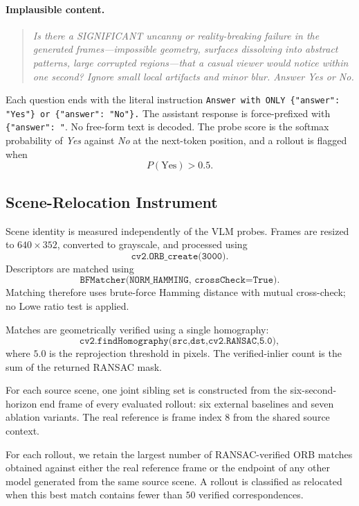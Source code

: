 \documentclass[letterpaper]{article} %
\begin{document}
\paragraph{Implausible content.}
\begin{quote}
\small
\emph{Is there a SIGNIFICANT uncanny or reality-breaking failure in the
generated frames---impossible geometry, surfaces dissolving into abstract
patterns, large corrupted regions---that a casual viewer would notice within
one second? Ignore small local artifacts and minor blur. Answer Yes or No.}
\end{quote}

Each question ends with the literal instruction
\texttt{Answer with ONLY \{"answer": "Yes"\} or \{"answer": "No"\}.}
The assistant response is force-prefixed with
\verb|{"answer": "|. No free-form text is decoded. The probe score is the
softmax probability of \emph{Yes} against \emph{No} at the next-token
position, and a rollout is flagged when
\[
P(\mathrm{Yes})>0.5.
\]


\subsection{Scene-Relocation Instrument}
\label{app:scene_relocation}

Scene identity is measured independently of the VLM probes. Frames are
resized to $640\times352$, converted to grayscale, and processed using
\[
\texttt{cv2.ORB\_create(3000)}.
\]
Descriptors are matched using
\[
\texttt{BFMatcher(NORM\_HAMMING, crossCheck=True)}.
\]
Matching therefore uses brute-force Hamming distance with mutual cross-check;
no Lowe ratio test is applied.

Matches are geometrically verified using a single homography:
\[
\texttt{cv2.findHomography(src,dst,cv2.RANSAC,5.0)},
\]
where $5.0$ is the reprojection threshold in pixels. The verified-inlier
count is the sum of the returned RANSAC mask.

For each source scene, one joint sibling set is constructed from the
six-second-horizon end frame of every evaluated rollout: six external
baselines and seven ablation variants. The real reference is frame index $8$
from the shared source context.

For each rollout, we retain the largest number of RANSAC-verified ORB matches
obtained against either the real reference frame or the endpoint of any other
model generated from the same source scene. A rollout is classified as
relocated when this best match contains fewer than $50$ verified
correspondences.
\end{document}
